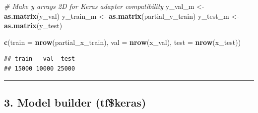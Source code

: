 \documentclass[
]{article}
\newenvironment{Shaded}{\begin{snugshade}}{\end{snugshade}}
\newcommand{\AttributeTok}[1]{\textcolor[rgb]{0.13,0.29,0.53}{#1}}
\newcommand{\CommentTok}[1]{\textcolor[rgb]{0.56,0.35,0.01}{\textit{#1}}}
\newcommand{\FunctionTok}[1]{\textcolor[rgb]{0.13,0.29,0.53}{\textbf{#1}}}
\newcommand{\NormalTok}[1]{#1}
\newcommand{\OtherTok}[1]{\textcolor[rgb]{0.56,0.35,0.01}{#1}}
\begin{document}
\begin{Shaded}
\begin{Highlighting}[]
\CommentTok{\# Make y arrays 2D for Keras adapter compatibility}
\NormalTok{y\_val\_m }\OtherTok{\textless{}{-}} \FunctionTok{as.matrix}\NormalTok{(y\_val)}
\NormalTok{y\_train\_m }\OtherTok{\textless{}{-}} \FunctionTok{as.matrix}\NormalTok{(partial\_y\_train)}
\NormalTok{y\_test\_m }\OtherTok{\textless{}{-}} \FunctionTok{as.matrix}\NormalTok{(y\_test)}

\FunctionTok{c}\NormalTok{(}\AttributeTok{train =} \FunctionTok{nrow}\NormalTok{(partial\_x\_train), }\AttributeTok{val =} \FunctionTok{nrow}\NormalTok{(x\_val), }\AttributeTok{test =} \FunctionTok{nrow}\NormalTok{(x\_test))}
\end{Highlighting}
\end{Shaded}

\begin{verbatim}
## train   val  test 
## 15000 10000 25000
\end{verbatim}

\begin{center}\rule{0.5\linewidth}{0.5pt}\end{center}

\subsection{3. Model builder (tf\$keras)}\label{model-builder-tfkeras}
\end{document}
